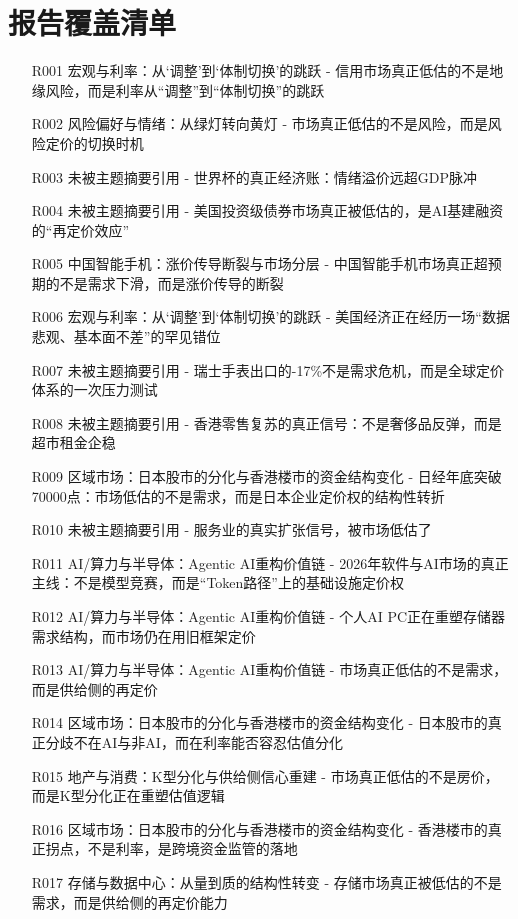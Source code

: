 \documentclass[11pt]{ctexart}
\begin{document}
\section{报告覆盖清单}
\begin{itemize}
  \item [R001] 宏观与利率：从‘调整’到‘体制切换’的跳跃 - 信用市场真正低估的不是地缘风险，而是利率从“调整”到“体制切换”的跳跃
  \item [R002] 风险偏好与情绪：从绿灯转向黄灯 - 市场真正低估的不是风险，而是风险定价的切换时机
  \item [R003] 未被主题摘要引用 - 世界杯的真正经济账：情绪溢价远超GDP脉冲
  \item [R004] 未被主题摘要引用 - 美国投资级债券市场真正被低估的，是AI基建融资的“再定价效应”
  \item [R005] 中国智能手机：涨价传导断裂与市场分层 - 中国智能手机市场真正超预期的不是需求下滑，而是涨价传导的断裂
  \item [R006] 宏观与利率：从‘调整’到‘体制切换’的跳跃 - 美国经济正在经历一场“数据悲观、基本面不差”的罕见错位
  \item [R007] 未被主题摘要引用 - 瑞士手表出口的-17\%不是需求危机，而是全球定价体系的一次压力测试
  \item [R008] 未被主题摘要引用 - 香港零售复苏的真正信号：不是奢侈品反弹，而是超市租金企稳
  \item [R009] 区域市场：日本股市的分化与香港楼市的资金结构变化 - 日经年底突破70000点：市场低估的不是需求，而是日本企业定价权的结构性转折
  \item [R010] 未被主题摘要引用 - 服务业的真实扩张信号，被市场低估了
  \item [R011] AI/算力与半导体：Agentic AI重构价值链 - 2026年软件与AI市场的真正主线：不是模型竞赛，而是“Token路径”上的基础设施定价权
  \item [R012] AI/算力与半导体：Agentic AI重构价值链 - 个人AI PC正在重塑存储器需求结构，而市场仍在用旧框架定价
  \item [R013] AI/算力与半导体：Agentic AI重构价值链 - 市场真正低估的不是需求，而是供给侧的再定价
  \item [R014] 区域市场：日本股市的分化与香港楼市的资金结构变化 - 日本股市的真正分歧不在AI与非AI，而在利率能否容忍估值分化
  \item [R015] 地产与消费：K型分化与供给侧信心重建 - 市场真正低估的不是房价，而是K型分化正在重塑估值逻辑
  \item [R016] 区域市场：日本股市的分化与香港楼市的资金结构变化 - 香港楼市的真正拐点，不是利率，是跨境资金监管的落地
  \item [R017] 存储与数据中心：从量到质的结构性转变 - 存储市场真正被低估的不是需求，而是供给侧的再定价能力

\end{itemize}
\end{document}
